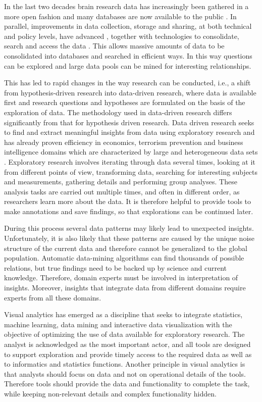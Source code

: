 \documentclass[twocolumn]{svjour3}
\begin{document}
In the last two decades brain research data has increasingly been gathered in a more open fashion and many databases are now available to the public \cite{milham_open_2012}. In parallel, improvements in data collection, storage and sharing, at both technical and policy levels, have advanced \cite{eckersley_neuroscience_2003}, together with technologies to consolidate, search and access the data \cite{van_horn_is_2009,wood_harnessing_2014}. This allows massive amounts of data to be consolidated into databases and searched in efficient ways. In this way questions can be explored and large data pools can be mined for interesting relationships.




This has led to rapid changes in the way research can be conducted, i.e., a shift from hypothesis-driven research into data-driven research, where data is available first and research questions and hypotheses are formulated on the basis of the exploration of data. The methodology used in data-driven research differs significantly from that for hypothesis driven research. Data driven research seeks to find and extract meaningful insights from data using exploratory research \cite{tukey_we_1980} and has already proven efficiency in economics, terrorism prevention and business intelligence domains which are characterized by large and heterogeneous data sets \cite{cook_illuminating_2005}. Exploratory research involves iterating through data several times, looking at it from different points of view, transforming data, searching for interesting subjects and measurements, gathering details and performing group analyses. These analysis tasks are carried out multiple times, and often in different order, as researchers learn more about the data. It is therefore helpful to provide tools to make annotations and save findings, so that explorations can be continued later.


During this process several data patterns may likely lead to unexpected insights. Unfortunately, it is also likely that these patterns are caused by the unique noise structure of the current data and therefore cannot be generalized to the global population. Automatic data-mining algorithms can find thousands of possible relations, but true findings need to be backed up by science and current knowledge.  Therefore, domain experts must be involved in interpretation of insights. Moreover, insights that integrate data from different domains require experts from all these domains.


Visual analytics \cite{keim_visual_2008} has emerged as a discipline that seeks to integrate statistics, machine learning, data mining and interactive data visualization with the objective of optimizing the use of data available for exploratory research. The analyst is acknowledged as the most important actor, and all tools are designed to support exploration and provide timely access to the required data as well as to informatics and statistics functions. Another principle in visual analytics is that analysts should focus on data and not on operational details of the tools. Therefore tools should provide the data and functionality to complete the task, while keeping non-relevant details and complex functionality hidden.
\end{document}
